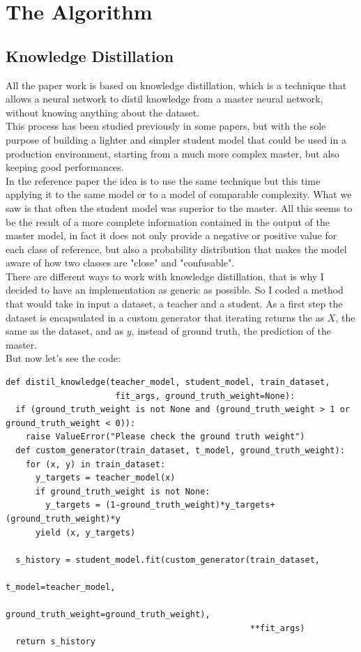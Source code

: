 \section{The Algorithm}
\subsection{Knowledge Distillation}
All the paper work is based on knowledge distillation, which is a technique that allows a neural network to distil knowledge from a master neural network, without knowing anything about the dataset.\\ 
This process has been studied previously in some papers\cite{kd}\cite{fokd}\cite{tkd}, but with the sole purpose of building a lighter and simpler student model that could be used in a production environment, starting from a much more complex master, but also keeping good performances.\\
In the reference paper the idea is to use the same technique but this time applying it to the same model or to a model of comparable complexity. What we saw is that often the student model was superior to the master. All this seems to be the result of a more complete information contained in the output of the master model, in fact it does not only provide a negative or positive value for each class of reference, but also a probability distribution that makes the model aware of how two classes are "close" and "confusable".\\
There are different ways to work with knowledge distillation, that is why I decided to have an implementation as generic as possible. So I coded a method that would take in input a dataset, a teacher and a student. As a first step the dataset is encapsulated in a custom generator that iterating returns the as $X$, the same as the dataset, and as $y$, instead of ground truth, the prediction of the master.\\
But now let's see the code:
\lstset{language=Python}
\lstset{frame=lines}
\lstset{basicstyle=\footnotesize}
\begin{lstlisting}
def distil_knowledge(teacher_model, student_model, train_dataset, 
                      fit_args, ground_truth_weight=None):
  if (ground_truth_weight is not None and (ground_truth_weight > 1 or ground_truth_weight < 0)):
    raise ValueError("Please check the ground truth weight")
  def custom_generator(train_dataset, t_model, ground_truth_weight):
    for (x, y) in train_dataset:
      y_targets = teacher_model(x)
      if ground_truth_weight is not None:
        y_targets = (1-ground_truth_weight)*y_targets+(ground_truth_weight)*y
      yield (x, y_targets)

  s_history = student_model.fit(custom_generator(train_dataset, 
                                                 t_model=teacher_model,
                                                 ground_truth_weight=ground_truth_weight),             
                                                 **fit_args)
  return s_history
\end{lstlisting}
\newpage
